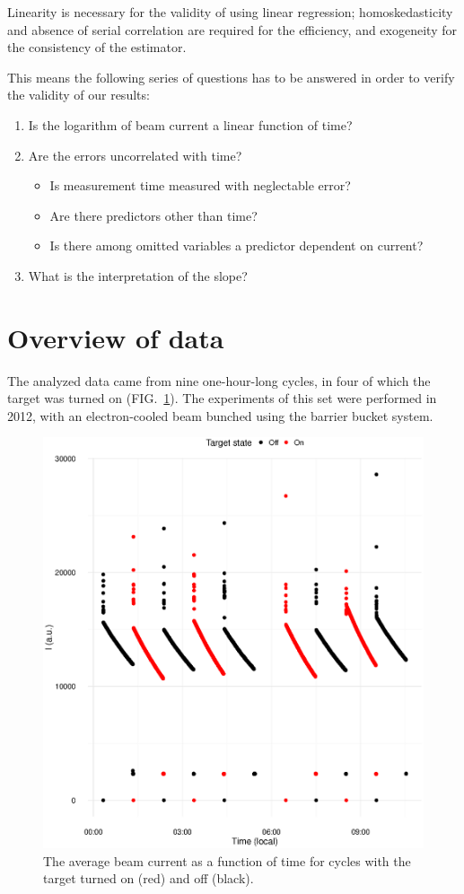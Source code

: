 \documentclass[reprint]{revtex4-1}
\newcommand{\scl}{.4}
\begin{document}
Linearity is necessary for the validity of using linear regression; homoskedasticity and absence of serial correlation are required for the efficiency, and exogeneity for the consistency of the estimator.

This means the following series of questions has to be answered in order to verify the validity of our results:
\begin{enumerate}
	\item Is the logarithm of beam current a linear function of time?
	\item Are the errors uncorrelated with time?
		\begin{itemize}
			\item Is measurement time measured with neglectable error?
			\item Are there predictors other than time?
			\item Is there among omitted variables a predictor dependent on current?
		\end{itemize}
	\item What is the interpretation of the slope?
\end{enumerate}


\section{Overview of data}
The analyzed data came from nine one-hour-long cycles, in four of which the target was turned on (FIG.~\ref{fig:TheNine}). The experiments of this set were performed in 2012, with an electron-cooled beam bunched using the barrier bucket system.

\begin{figure}[h]
\includegraphics[scale=\scl]{img/TheNineCycles.eps}
\caption{The average beam current as a function of time for cycles with the target turned on (red) and off (black).\label{fig:TheNine}}
\end{figure} 
\end{document}
